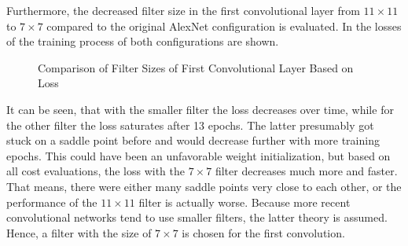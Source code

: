 Furthermore, the decreased filter size in the first convolutional layer from $11 \times 11$ to $7 \times 7$ compared to the original AlexNet configuration is evaluated.
In  the losses of the training process of both configurations are shown.
\begin{figure}
	\setlength{}
	\setlength{}
	\centering
	
	\caption{Comparison of Filter Sizes of First Convolutional Layer Based on Loss}
	\label{fig:first-conv-filter}
\end{figure}
It can be seen, that with the smaller filter the loss decreases over time, while for the other filter the loss saturates after 13 epochs.
The latter presumably got stuck on a saddle point before and would decrease further with more training epochs.
This could have been an unfavorable weight initialization, but based on all cost evaluations, the loss with the $7 \times 7$ filter decreases much more and faster.
That means, there were either many saddle points very close to each other, or the performance of the $11 \times 11$ filter is actually worse.
Because more recent convolutional networks tend to use smaller filters, the latter theory is assumed.
Hence, a filter with the size of $7 \times 7$ is chosen for the first convolution.

